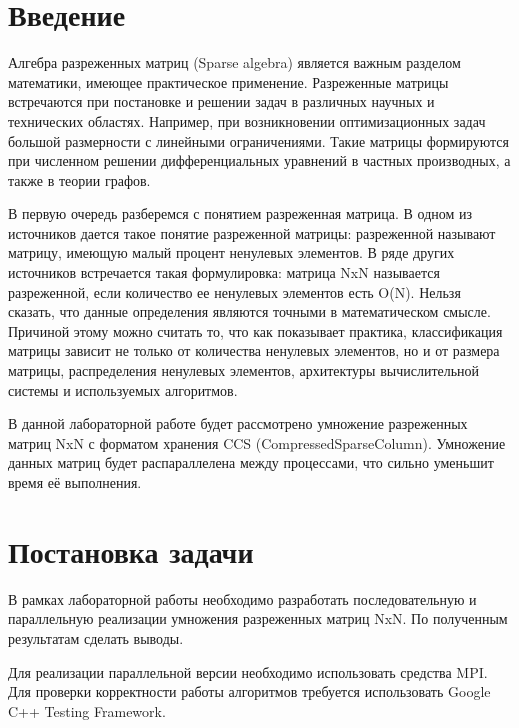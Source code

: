 \documentclass{report}
\begin{document}
\setcounter{page}{2}

\tableofcontents
\newpage

\section*{Введение}
Алгебра разреженных матриц (Sparse algebra) является важным разделом
математики, имеющее практическое применение. Разреженные матрицы
встречаются при постановке и решении задач в различных научных и
технических областях. Например, при возникновении оптимизационных задач
большой размерности с линейными ограничениями. Такие матрицы формируются
при численном решении дифференциальных уравнений в частных производных, а
также в теории графов.
\par В первую очередь разберемся с понятием разреженная матрица. В одном
из источников дается такое понятие разреженной матрицы: разреженной
называют матрицу, имеющую малый процент ненулевых элементов. В ряде
других источников встречается такая формулировка: матрица NxN называется
разреженной, если количество ее ненулевых элементов есть O(N). Нельзя сказать,
что данные определения являются точными в математическом смысле. Причиной
этому можно считать то, что как показывает практика, классификация матрицы
зависит не только от количества ненулевых элементов, но и от размера матрицы,
распределения ненулевых элементов, архитектуры вычислительной системы и
используемых алгоритмов.
\par В данной лабораторной работе будет рассмотрено умножение разреженных матриц NxN с форматом хранения CCS (CompressedSparseColumn). Умножение данных матриц будет распараллелена между процессами, что сильно уменьшит время её выполнения.
\newpage

\section*{Постановка задачи}
В рамках лабораторной работы необходимо разработать последовательную и параллельную реализации умножения разреженных матриц NxN. По полученным результатам сделать выводы.
\par Для реализации параллельной версии необходимо использовать средства MPI. Для проверки корректности работы алгоритмов требуется использовать Google C++ Testing Framework.
\newpage

\end{document}
